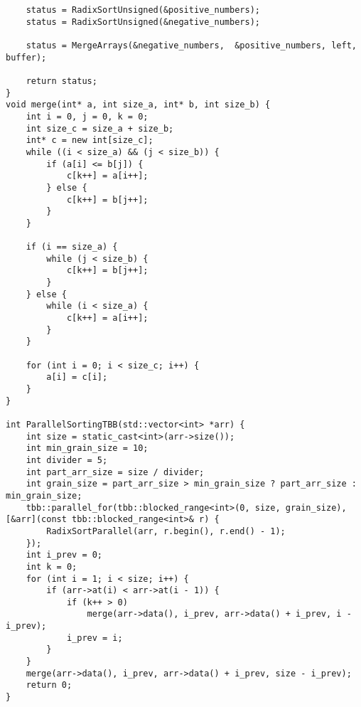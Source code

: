 \documentclass{report}
\begin{document}
\begin{lstlisting}
    status = RadixSortUnsigned(&positive_numbers);
    status = RadixSortUnsigned(&negative_numbers);

    status = MergeArrays(&negative_numbers,  &positive_numbers, left,  buffer);

    return status;
}
void merge(int* a, int size_a, int* b, int size_b) {
    int i = 0, j = 0, k = 0;
    int size_c = size_a + size_b;
    int* c = new int[size_c];
    while ((i < size_a) && (j < size_b)) {
        if (a[i] <= b[j]) {
            c[k++] = a[i++];
        } else {
            c[k++] = b[j++];
        }
    }

    if (i == size_a) {
        while (j < size_b) {
            c[k++] = b[j++];
        }
    } else {
        while (i < size_a) {
            c[k++] = a[i++];
        }
    }

    for (int i = 0; i < size_c; i++) {
        a[i] = c[i];
    }
}

int ParallelSortingTBB(std::vector<int> *arr) {
    int size = static_cast<int>(arr->size());
    int min_grain_size = 10;
    int divider = 5;
    int part_arr_size = size / divider;
    int grain_size = part_arr_size > min_grain_size ? part_arr_size : min_grain_size;
    tbb::parallel_for(tbb::blocked_range<int>(0, size, grain_size), [&arr](const tbb::blocked_range<int>& r) {
        RadixSortParallel(arr, r.begin(), r.end() - 1);
    });
    int i_prev = 0;
    int k = 0;
    for (int i = 1; i < size; i++) {
        if (arr->at(i) < arr->at(i - 1)) {
            if (k++ > 0)
                merge(arr->data(), i_prev, arr->data() + i_prev, i - i_prev);
            i_prev = i;
        }
    }
    merge(arr->data(), i_prev, arr->data() + i_prev, size - i_prev);
    return 0;
}

\end{lstlisting}
\end{document}
